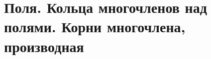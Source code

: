 \documentclass[../main/document.tex]{subfiles}
\begin{document}
\section{Поля. Кольца многочленов над полями. Корни многочлена, производная}
\end{document}
